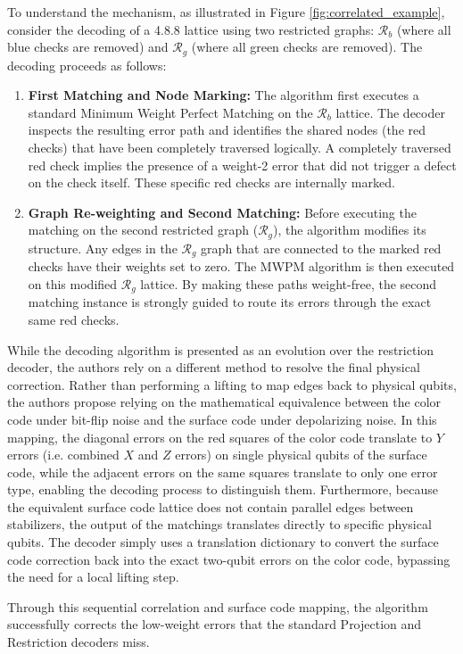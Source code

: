 To understand the mechanism, as illustrated in Figure \ref{fig:correlated_example}, consider the decoding of a 4.8.8 lattice using two restricted graphs: $\mathcal{R}_b$ (where all blue checks are removed) and $\mathcal{R}_g$ (where all green checks are removed). The decoding proceeds as follows:

\begin{enumerate}
    \item \textbf{First Matching and Node Marking:} The algorithm first executes a standard Minimum Weight Perfect Matching on the $\mathcal{R}_b$ lattice. The decoder inspects the resulting error path and identifies the shared nodes (the red checks) that have been completely traversed logically. A completely traversed red check implies the presence of a weight-2 error that did not trigger a defect on the check itself. These specific red checks are internally marked.
    \item \textbf{Graph Re-weighting and Second Matching:} Before executing the matching on the second restricted graph ($\mathcal{R}_g$), the algorithm modifies its structure. Any edges in the $\mathcal{R}_g$ graph that are connected to the marked red checks have their weights set to zero. The MWPM algorithm is then executed on this modified $\mathcal{R}_g$ lattice. By making these paths weight-free, the second matching instance is strongly guided to route its errors through the exact same red checks.
\end{enumerate}

While the decoding algorithm is presented as an evolution over the restriction decoder, the authors rely on a different method to resolve the final physical correction. Rather than performing a lifting to map edges back to physical qubits, the authors propose relying on the mathematical equivalence between the color code under bit-flip noise and the surface code under depolarizing noise. In this mapping, the diagonal errors on the red squares of the color code translate to $Y$ errors (i.e. combined $X$ and $Z$ errors) on single physical qubits of the surface code, while the adjacent errors on the same squares translate to only one error type, enabling the decoding process to distinguish them. Furthermore, because the equivalent surface code lattice does not contain parallel edges between stabilizers, the output of the matchings translates directly to specific physical qubits. The decoder simply uses a translation dictionary to convert the surface code correction back into the exact two-qubit errors on the color code, bypassing the need for a local lifting step.

Through this sequential correlation and surface code mapping, the algorithm successfully corrects the low-weight errors that the standard Projection and Restriction decoders miss.
